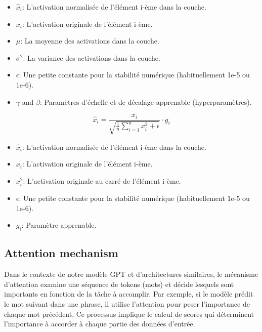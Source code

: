 \documentclass{rapport}
\begin{document}
            
            \begin{itemize}
                \item $\hat{x}_{i}$: L'activation normalisée de l'élément i-ème dans la couche.
                \item $x_i$: L'activation originale de l'élément i-ème.
                \item $\mu$: La moyenne des activations dans la couche.
                \item $\sigma^2$: La variance des activations dans la couche.
                \item $\epsilon$: Une petite constante pour la stabilité numérique (habituellement 1e-5 ou 1e-6).
                \item $\gamma$ and $\beta$: Paramètres d'échelle et de décalage apprenable (hyperparamètres).
            \end{itemize}
            
            \begin{equation}
                \hat{x}_i = \frac{x_i}{\sqrt{\frac{1}{n} \sum_{i=1}^n x_i^2 + \epsilon}} \cdot g_i
            \end{equation}
            
            \begin{itemize}
                \item $\hat{x}_{i}$: L'activation normalisée de l'élément i-ème dans la couche.
                \item $x_i$: L'activation originale de l'élément i-ème.
                \item $x_i^2$: L'activation originale au carré de l'élément i-ème.
                \item $\epsilon$: Une petite constante pour la stabilité numérique (habituellement 1e-5 ou 1e-6).
                \item $g_i$:  Paramètre apprenable.
            \end{itemize}

        \subsection{Attention mechanism}

             Dans le contexte de notre modèle GPT et d'architectures similaires, le mécanisme d'attention examine une séquence de tokens (mots) et décide lesquels sont importants en fonction de la tâche à accomplir. Par exemple, si le modèle prédit le mot suivant dans une phrase, il utilise l’attention pour peser l’importance de chaque mot précédent. Ce processus implique le calcul de scores qui déterminent l’importance à accorder à chaque partie des données d’entrée.
\end{document}
